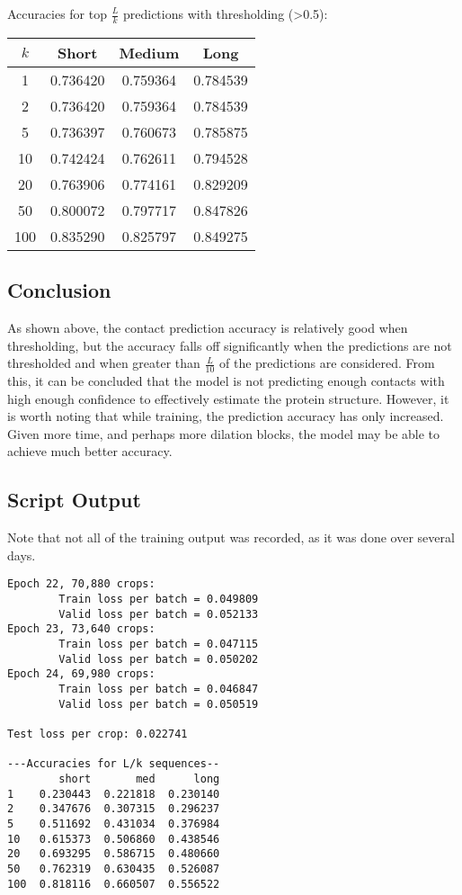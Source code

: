 \documentclass[11pt]{article}
\newcommand{\np}{\newpage}
\begin{document}
Accuracies for top $\frac{L}{k}$ predictions with thresholding (>0.5):\\[4mm]
\begin{tabular}{c|c|c|c}
$k$ & Short & Medium & Long\\
\hline
1   & 0.736420 & 0.759364 & 0.784539\\
2   & 0.736420 & 0.759364 & 0.784539\\
5   & 0.736397 & 0.760673 & 0.785875\\
10  & 0.742424 & 0.762611 & 0.794528\\
20  & 0.763906 & 0.774161 & 0.829209\\
50  & 0.800072 & 0.797717 & 0.847826\\
100 & 0.835290 & 0.825797 & 0.849275
\end{tabular}

\subsection{Conclusion}
As shown above, the contact prediction accuracy is relatively good when thresholding, but the accuracy falls off significantly when the predictions are not thresholded and when greater than $\frac{L}{10}$ of the predictions are considered.  From this, it can be concluded that the model is not predicting enough contacts with high enough confidence to effectively estimate the protein structure.  However, it is worth noting that while training, the prediction accuracy has only increased.  Given more time, and perhaps more dilation blocks, the model may be able to achieve much better accuracy.
\np

\subsection{Script Output}
Note that not all of the training output was recorded, as it was done over several days.

\begin{lstlisting}
Epoch 22, 70,880 crops:
        Train loss per batch = 0.049809
        Valid loss per batch = 0.052133
Epoch 23, 73,640 crops:
        Train loss per batch = 0.047115
        Valid loss per batch = 0.050202
Epoch 24, 69,980 crops:
        Train loss per batch = 0.046847
        Valid loss per batch = 0.050519

Test loss per crop: 0.022741

---Accuracies for L/k sequences--
        short       med      long
1    0.230443  0.221818  0.230140
2    0.347676  0.307315  0.296237
5    0.511692  0.431034  0.376984
10   0.615373  0.506860  0.438546
20   0.693295  0.586715  0.480660
50   0.762319  0.630435  0.526087
100  0.818116  0.660507  0.556522
\end{lstlisting}
\end{document}
